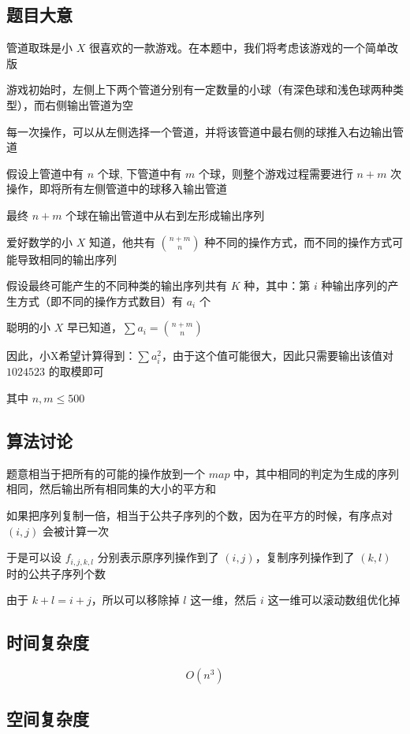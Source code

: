 \documentclass[UTF8]{article}
\begin{document}
\subsection{题目大意}

管道取珠是小 $X$ 很喜欢的一款游戏。在本题中，我们将考虑该游戏的一个简单改版

游戏初始时，左侧上下两个管道分别有一定数量的小球（有深色球和浅色球两种类型），而右侧输出管道为空

每一次操作，可以从左侧选择一个管道，并将该管道中最右侧的球推入右边输出管道

假设上管道中有 $n$ 个球, 下管道中有 $m$ 个球，则整个游戏过程需要进行 $n+m$ 次操作，即将所有左侧管道中的球移入输出管道

最终 $n+m$ 个球在输出管道中从右到左形成输出序列

爱好数学的小 $X$ 知道，他共有 ${n+m \choose n}$ 种不同的操作方式，而不同的操作方式可能导致相同的输出序列

假设最终可能产生的不同种类的输出序列共有 $K$ 种，其中：第 $i$ 种输出序列的产生方式（即不同的操作方式数目）有 $a_i$ 个

聪明的小 $X$ 早已知道，$\sum a_i={n+m \choose n}$

因此，小X希望计算得到：$\sum a_i^2$，由于这个值可能很大，因此只需要输出该值对 $1024523$ 的取模即可

其中 $n, m \le 500$

\subsection{算法讨论}

题意相当于把所有的可能的操作放到一个 $map$ 中，其中相同的判定为生成的序列相同，然后输出所有相同集的大小的平方和

如果把序列复制一倍，相当于公共子序列的个数，因为在平方的时候，有序点对 $(i,j)$ 会被计算一次

于是可以设 $f_{i,j,k,l}$ 分别表示原序列操作到了 $(i,j)$，复制序列操作到了 $(k,l)$ 时的公共子序列个数

由于 $k+l=i+j$，所以可以移除掉 $l$ 这一维，然后 $i$ 这一维可以滚动数组优化掉

\subsection{时间复杂度}

$$
O(n^3)
$$

\subsection{空间复杂度}
\end{document}
